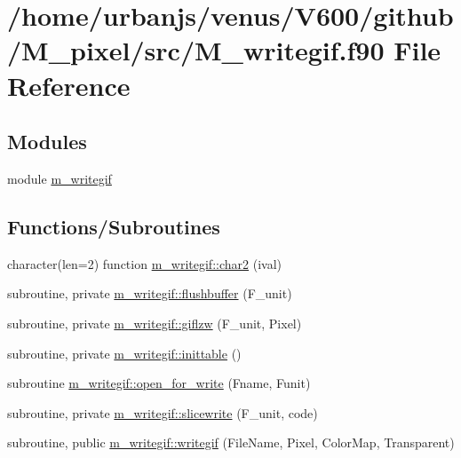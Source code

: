 \hypertarget{M__writegif_8f90}{}\section{/home/urbanjs/venus/\+V600/github/\+M\+\_\+pixel/src/\+M\+\_\+writegif.f90 File Reference}
\label{M__writegif_8f90}
\subsection*{Modules}
\begin{DoxyCompactItemize}
\item 
module \mbox{\hyperlink{namespacem__writegif}{m\+\_\+writegif}}
\end{DoxyCompactItemize}
\subsection*{Functions/\+Subroutines}
\begin{DoxyCompactItemize}
\item 
character(len=2) function \mbox{\hyperlink{namespacem__writegif_a79ebbfd4c7df8520a82c75c3a62f0c96}{m\+\_\+writegif\+::char2}} (ival)
\item 
subroutine, private \mbox{\hyperlink{namespacem__writegif_a48c5ca5487be9dbe565c0d4f8aa02d0d}{m\+\_\+writegif\+::flushbuffer}} (F\+\_\+unit)
\item 
subroutine, private \mbox{\hyperlink{namespacem__writegif_a13c09be69495f4ba21ecb7c134216a17}{m\+\_\+writegif\+::giflzw}} (F\+\_\+unit, Pixel)
\item 
subroutine, private \mbox{\hyperlink{namespacem__writegif_aed61b15f90188ddf39b71aa0c73a82a8}{m\+\_\+writegif\+::inittable}} ()
\item 
subroutine \mbox{\hyperlink{namespacem__writegif_adb045213dd61508ad7dc7e5640fde67d}{m\+\_\+writegif\+::open\+\_\+for\+\_\+write}} (Fname, Funit)
\item 
subroutine, private \mbox{\hyperlink{namespacem__writegif_a27e0ec2c6e05428641179bf35762adb7}{m\+\_\+writegif\+::slicewrite}} (F\+\_\+unit, code)
\item 
subroutine, public \mbox{\hyperlink{namespacem__writegif_a02be37849028b2f9484cff1b4285375d}{m\+\_\+writegif\+::writegif}} (File\+Name, Pixel, Color\+Map, Transparent)
\end{DoxyCompactItemize}
